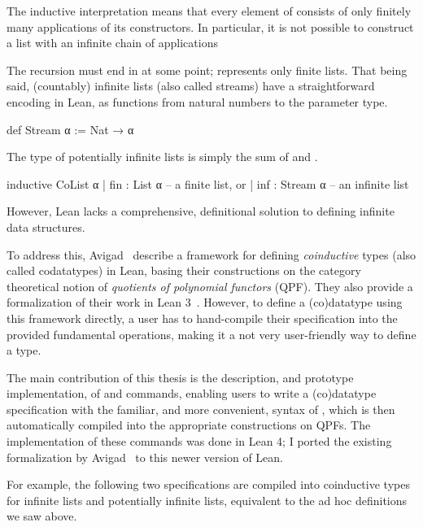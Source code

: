 The inductive interpretation means that every element of  consists of only
finitely many applications of its constructors. In particular, it is not possible
to construct a list with an infinite chain of  applications
\begin{center}
\end{center}
The recursion must end in  at some point;  represents only finite lists.
That being said, (countably) infinite lists (also called streams) have a straightforward encoding in Lean, as functions from natural numbers to the parameter type.
\begin{leancode}
    def Stream α := Nat → α
\end{leancode}

The type of potentially infinite lists is simply the sum of  and .
\begin{leancode}
  inductive CoList α
    | fin : List α      -- a finite list, or
    | inf : Stream α    -- an infinite list
\end{leancode}

However, Lean lacks a comprehensive, definitional solution to defining infinite data structures.

To address this, Avigad \etal{}\ describe a framework for defining \emph{coinductive} types (also called codatatypes) in Lean,
basing their constructions on the category theoretical notion of \emph{quotients of polynomial functors} (QPF).
They also provide a formalization of their work in Lean 3~\cite{avigadDataTypesQuotients2019a}.
However, to define a (co)datatype using this framework directly, a user has to hand-compile their specification 
into the provided fundamental operations, making it a not very user-friendly way to define a type.

The main contribution of this thesis is the description, and prototype implementation, of \data{} and \codata{} commands, enabling users to write a (co)datatype specification with the familiar, and more convenient, syntax of \inductive{}, which is then automatically compiled into the appropriate constructions on QPFs.
The implementation of these commands was done in Lean 4; I ported the existing formalization by Avigad \etal\ to this newer version of Lean.


For example, the following two \codata{} specifications are compiled into coinductive types for infinite lists and potentially infinite lists, equivalent to the ad hoc definitions we saw above.

